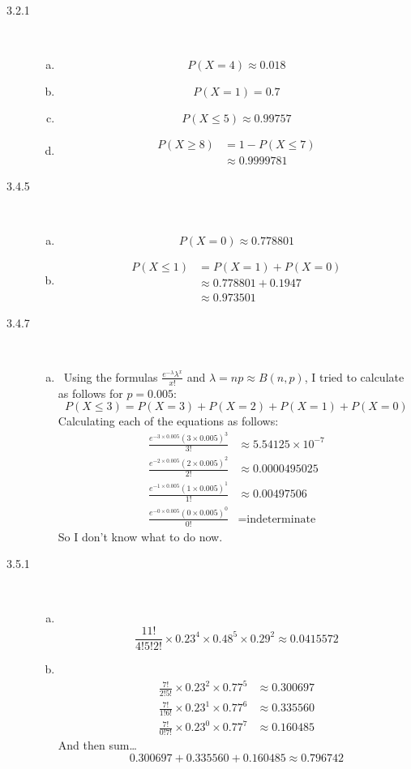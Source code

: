 \documentclass[letterpaper,10pt]{article}
\begin{document}
\begin{description}
\item[3.2.1] \ 
\begin{enumerate}[a)]
\item \[P(X=4)\approx 0.018\]
\item \[P(X=1)=0.7\]
\item \[P(X\leq 5)\approx 0.99757\]
\item\begin{align*}
P(X\geq 8) &= 1-P(X\leq 7) \\
&\approx 0.9999781
\end{align*}
\end{enumerate}

\item[3.4.5] \ 
\begin{enumerate}[a)]
\item \[P(X=0)\approx 0.778801\]
\item\begin{align*}
P(X\leq 1) &= P(X=1)+P(X=0) \\
&\approx 0.778801+0.1947 \\
&\approx 0.973501
\end{align*}
\end{enumerate}

\item[3.4.7] \ 
\begin{enumerate}[a)]
\item \ 
Using the formulas $\frac{e^{-\lambda}\lambda^{x}}{x!}$ and $\lambda = np\approx B(n, p)$, I tried to calculate as follows for $p=0.005$:
\[ P(X\leq 3) = P(X=3)+P(X=2)+P(X=1)+P(X=0) \]
Calculating each of the equations as follows:
\begin{align*}
\frac{e^{-3\times 0.005}(3\times 0.005)^{3}}{3!} &\approx 5.54125\times 10^{-7} \\
\frac{e^{-2\times 0.005}(2\times 0.005)^{2}}{2!} &\approx 0.0000495025 \\
\frac{e^{-1\times 0.005}(1\times 0.005)^{1}}{1!} &\approx 0.00497506 \\
\frac{e^{-0\times 0.005}(0\times 0.005)^{0}}{0!} &= \mbox{indeterminate}
\end{align*}
So I don't know what to do now.
\end{enumerate}

\item[3.5.1] \ 
\begin{enumerate}[a)]
\item\ 
\[ \frac{11!}{4!5!2!}\times 0.23^{4}\times 0.48^{5}\times 0.29^{2} \approx 0.0415572 \]
\item\ 
\begin{align*} 
\frac{7!}{2!5!}\times 0.23^{2}\times 0.77^{5} &\approx 0.300697 \\
\frac{7!}{1!6!}\times 0.23^{1}\times 0.77^{6} &\approx 0.335560 \\
\frac{7!}{0!7!}\times 0.23^{0}\times 0.77^{7} &\approx 0.160485
\end{align*}
And then sum\dots
\[ 0.300697+0.335560+0.160485\approx 0.796742\]
\end{enumerate}


\end{description}
\end{document}

